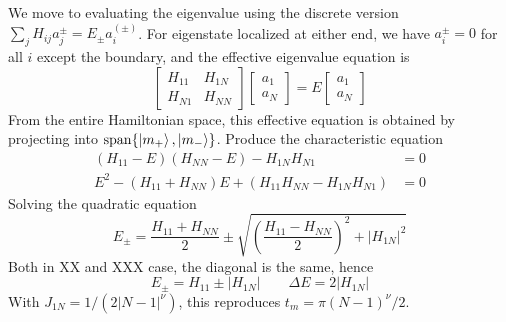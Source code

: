 \documentclass[../../../main.tex]{subfiles}
\begin{document}
We move to evaluating the eigenvalue using the discrete version $\textstyle\sum_{j} H_{ij}a_j^{\pm} = E_\pm a_i^{(\pm)}$.
For eigenstate localized at either end, we have $a^\pm_i=0$ for all $i$ except the boundary, and the effective eigenvalue equation is
\begin{equation*}
  \begin{bmatrix}
    H_{11} & H_{1N} \\
    H_{N1} & H_{NN}
  \end{bmatrix}
  \begin{bmatrix}
    a_1 \\
    a_N
  \end{bmatrix}
  =
  E
  \begin{bmatrix}
    a_1 \\
    a_N
  \end{bmatrix}
\end{equation*}
From the entire Hamiltonian space, this effective equation is obtained by projecting into $\mathrm{span} \{\ket{m_+},\ket{m_-}\}$.
Produce the characteristic equation
\begin{align*}
  (H_{11}-E)(H_{NN}-E)-H_{1N}H_{N1}                           & =  0 \\
  E^2-(H_{11}+H_{NN})E+\left(H_{11}H_{NN}-H_{1N}H_{N1}\right) & =  0
\end{align*}
Solving the quadratic equation
\begin{equation*}
  E_\pm=
  \frac{H_{11}+H_{NN}}{2}\pm\sqrt{\left(\frac{H_{11}-H_{NN}}{2}\right)^2+|H_{1N}|^2}
\end{equation*}
Both in XX and XXX case, the diagonal is the same, hence
\begin{equation*}
  E_\pm = H_{11} \pm |H_{1N}|\qquad
  \Delta E = 2|H_{1N}|
\end{equation*}
With $J_{1N} = 1/(2|N-1|^\nu)$, this reproduces $t_m = \pi(N-1)^\nu/2$.
\end{document}
